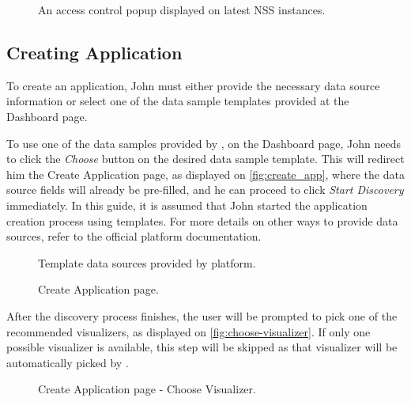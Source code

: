 \begin{figure}[h]
\centering
{}
\caption{An access control popup displayed on latest NSS instances.}
\label{fig:lpa_solid_authorize}
\end{figure}

\subsection{Creating Application}

To create an application, John must either provide the necessary data source information or select one of the data sample templates provided at the Dashboard page.

To use one of the data samples provided by \lpa{}, on the Dashboard page, John needs to click the \textit{Choose} button on the desired data sample template. This will redirect him the Create Application page, as displayed on \autoref{fig:create_app}, where the data source fields will already be pre-filled, and he can proceed to click \textit{Start Discovery} immediately. In this guide, it is assumed that John started the application creation process using templates. For more details on other ways to provide data sources, refer to the official \lpa{} platform documentation.

\begin{figure}[h]
\centering
{}
\caption{Template data sources provided by \lpa{} platform.}
\label{fig:data_samples}
\end{figure}

\begin{figure}[h]
\centering
{}
\caption{Create Application page.}
\label{fig:create_app}
\end{figure}

After the discovery process finishes, the user will be prompted to pick one of the recommended visualizers, as displayed on \autoref{fig:choose-visualizer}. If only one possible visualizer is available, this step will be skipped as that visualizer will be automatically picked by \lpa{}.

\begin{figure}[h]
\centering
{}
\caption{Create Application page - Choose Visualizer.}
\label{fig:choose-visualizer}
\end{figure}

